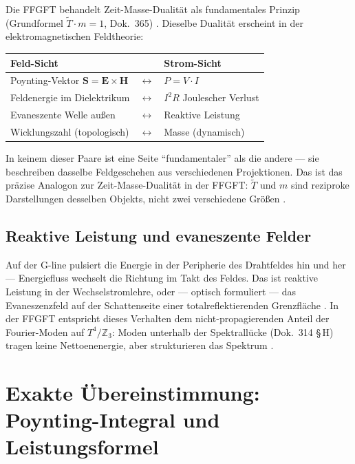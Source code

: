 Die FFGFT behandelt Zeit-Masse-Dualität als fundamentales Prinzip
(Grundformel $\tilde{T}\cdot m=1$, Dok.~365) \SetzM. Dieselbe Dualität
erscheint in der elektromagnetischen Feldtheorie:

\begin{center}
\begin{tabular}{@{}lll@{}}
\toprule
\textbf{Feld-Sicht} & & \textbf{Strom-Sicht} \\
\midrule
Poynting-Vektor $\mathbf{S} = \mathbf{E}\times\mathbf{H}$ & $\longleftrightarrow$ & $P = V \cdot I$ \\
Feldenergie im Dielektrikum & $\longleftrightarrow$ & $I^2 R$ Joulescher Verlust \\
Evaneszente Welle außen & $\longleftrightarrow$ & Reaktive Leistung \\
Wicklungszahl (topologisch) & $\longleftrightarrow$ & Masse (dynamisch) \\
\bottomrule
\end{tabular}
\end{center}

In keinem dieser Paare ist eine Seite ``fundamentaler'' als die andere ---
sie beschreiben dasselbe Feldgeschehen aus verschiedenen Projektionen.
Das ist das präzise Analogon zur Zeit-Masse-Dualität in der FFGFT:
$\tilde{T}$ und $m$ sind reziproke Darstellungen desselben Objekts, nicht
zwei verschiedene Größen \KM.

\subsection*{Reaktive Leistung und evaneszente Felder}

Auf der G-line pulsiert die Energie in der Peripherie des Drahtfeldes
hin und her --- Energiefluss wechselt die Richtung im Takt des Feldes.
Das ist reaktive Leistung in der Wechselstromlehre, oder --- optisch
formuliert --- das Evaneszenzfeld auf der Schattensei\-te einer totalreflektierenden
Grenzfläche \EM. In der FFGFT entspricht dieses Verhalten dem nicht-propagierenden
Anteil der Fourier-Moden auf $T^4/\mathbb{Z}_3$: Moden unterhalb der
Spektrallücke (Dok.~314 §\,H) tragen keine Nettoenenergie, aber strukturieren
das Spektrum \SM.

\section{Exakte Übereinstimmung: Poynting-Integral und Leistungsformel}

